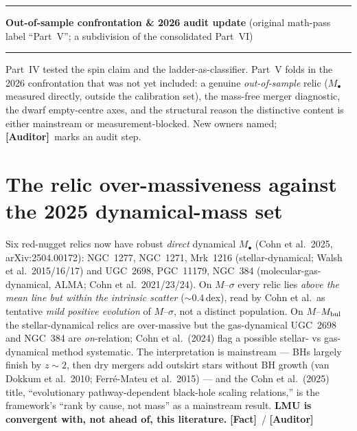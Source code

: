 \documentclass[11pt]{article}
\newcommand{\Fact}{\textbf{\textcolor{green!45!black}{[Fact]}}}
\newcommand{\Auditor}{\textbf{\textcolor{teal!55!black}{[Auditor]}}}
\newcommand{\Mbh}{M_{\bullet}}
\begin{document}
\vspace{10pt}\hrule\vspace{2pt}
\begin{center}{\LARGE\bfseries Out-of-sample confrontation \& 2026 audit update} {\small (original math-pass label ``Part~V''; a subdivision of the consolidated Part~VI)}\end{center}
\vspace{1pt}\hrule\vspace{5pt}
{\small Part~IV tested the spin claim and the ladder-as-classifier. Part~V folds in the 2026 confrontation that was not yet included: a genuine \emph{out-of-sample} relic ($\Mbh$ measured directly, outside the calibration set), the mass-free merger diagnostic, the dwarf empty-centre axes, and the structural reason the distinctive content is either mainstream or measurement-blocked. New owners named; \Auditor\ marks an audit step.}

\section{The relic over-massiveness against the 2025 dynamical-mass set}
Six red-nugget relics now have robust \emph{direct} dynamical $\Mbh$ (Cohn et al.\ 2025, arXiv:2504.00172): NGC~1277, NGC~1271, Mrk~1216 (stellar-dynamical; Walsh et al.\ 2015/16/17) and UGC~2698, PGC~11179, NGC~384 (molecular-gas-dynamical, ALMA; Cohn et al.\ 2021/23/24). On $M$--$\sigma$ every relic lies \emph{above the mean line but within the intrinsic scatter} ($\sim0.4$\,dex), read by Cohn et al.\ as tentative \emph{mild positive evolution} of $M$--$\sigma$, not a distinct population. On $M$--$M_{\rm bul}$ the stellar-dynamical relics are over-massive but the gas-dynamical UGC~2698 and NGC~384 are \emph{on}-relation; Cohn et al.\ (2024) flag a possible stellar- vs gas-dynamical method systematic. The interpretation is mainstream --- BHs largely finish by $z\!\sim\!2$, then dry mergers add outskirt stars without BH growth (van Dokkum et al.\ 2010; Ferr\'e-Mateu et al.\ 2015) --- and the Cohn et al.\ (2025) title, ``evolutionary pathway-dependent black-hole scaling relations,'' is the framework's ``rank by cause, not mass'' as a mainstream result. \textbf{LMU is convergent with, not ahead of, this literature.} \Fact\ / \Auditor
\end{document}
